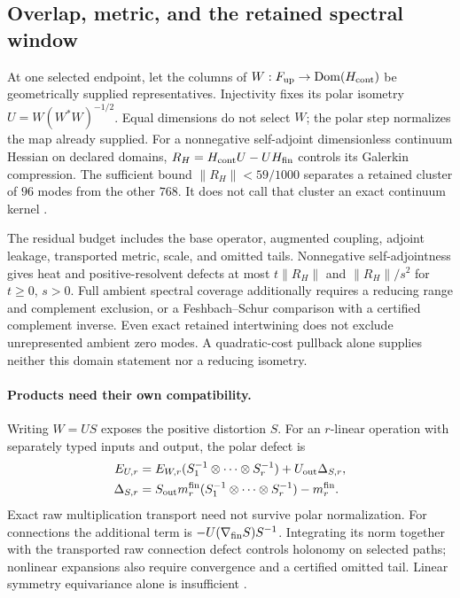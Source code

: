 \documentclass[11pt]{article}
\begin{document}
\subsection{Overlap, metric, and the retained spectral window}
\label{sec:fsb03a}
At one selected endpoint, let the columns of $W:F_{\rm up}\to
\operatorname{Dom}(H_{\rm cont})$ be geometrically supplied representatives.
Injectivity fixes its polar isometry $U=W(W^*W)^{-1/2}$. Equal dimensions
do not select $W$; the polar step normalizes the map already supplied. For
a nonnegative self-adjoint dimensionless continuum Hessian on declared
domains, $R_H=H_{\rm cont}U-UH_{\rm fin}$ controls its Galerkin compression.
The sufficient bound $\|R_H\|<59/1000$ separates a retained cluster of
$96$ modes from the other $768$. It does not call that cluster an exact
continuum kernel \cite{FSB03a}.

The residual budget includes the base operator, augmented coupling, adjoint
leakage, transported metric, scale, and omitted tails. Nonnegative
self-adjointness gives heat and positive-resolvent defects at most
$t\|R_H\|$ and $\|R_H\|/s^2$ for $t\geq0$, $s>0$. Full ambient
spectral coverage additionally requires a reducing range and complement
exclusion, or a Feshbach--Schur comparison with a certified complement
inverse. Even exact retained intertwining does not exclude unrepresented
ambient zero modes. A quadratic-cost pullback alone supplies neither this
domain statement nor a reducing isometry.

\paragraph{Products need their own compatibility.}\label{sec:fsb03b}
Writing $W=US$ exposes the positive distortion $S$. For an $r$-linear
operation with separately typed inputs and output, the polar defect is
\begin{align*}
 E_{U,r}&=E_{W,r}(S_1^{-1}\otimes\cdots\otimes S_r^{-1})
            +U_{\rm out}\Delta_{S,r},\\
 \Delta_{S,r}&=S_{\rm out}m_r^{\rm fin}
 (S_1^{-1}\otimes\cdots\otimes S_r^{-1})-m_r^{\rm fin}.
\end{align*}
Exact raw multiplication transport need not survive polar normalization.
For connections the additional term is $-U(\nabla_{\rm fin}S)S^{-1}$.
Integrating its norm together with the transported raw connection defect
controls holonomy on selected paths; nonlinear expansions also require
convergence and a certified omitted tail. Linear symmetry equivariance alone
is insufficient \cite{FSB03b}.
\end{document}
